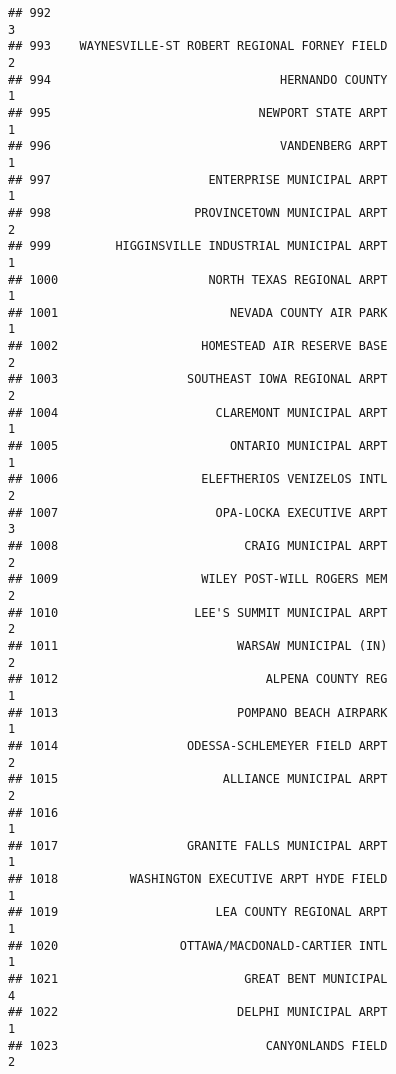 \documentclass[
]{article}
\begin{document}
\begin{verbatim}
## 992                                                                          3
## 993    WAYNESVILLE-ST ROBERT REGIONAL FORNEY FIELD                           2
## 994                                HERNANDO COUNTY                           1
## 995                             NEWPORT STATE ARPT                           1
## 996                                VANDENBERG ARPT                           1
## 997                      ENTERPRISE MUNICIPAL ARPT                           1
## 998                    PROVINCETOWN MUNICIPAL ARPT                           2
## 999         HIGGINSVILLE INDUSTRIAL MUNICIPAL ARPT                           1
## 1000                     NORTH TEXAS REGIONAL ARPT                           1
## 1001                        NEVADA COUNTY AIR PARK                           1
## 1002                    HOMESTEAD AIR RESERVE BASE                           2
## 1003                  SOUTHEAST IOWA REGIONAL ARPT                           2
## 1004                      CLAREMONT MUNICIPAL ARPT                           1
## 1005                        ONTARIO MUNICIPAL ARPT                           1
## 1006                    ELEFTHERIOS VENIZELOS INTL                           2
## 1007                      OPA-LOCKA EXECUTIVE ARPT                           3
## 1008                          CRAIG MUNICIPAL ARPT                           2
## 1009                    WILEY POST-WILL ROGERS MEM                           2
## 1010                   LEE'S SUMMIT MUNICIPAL ARPT                           2
## 1011                         WARSAW MUNICIPAL (IN)                           2
## 1012                             ALPENA COUNTY REG                           1
## 1013                         POMPANO BEACH AIRPARK                           1
## 1014                  ODESSA-SCHLEMEYER FIELD ARPT                           2
## 1015                       ALLIANCE MUNICIPAL ARPT                           2
## 1016                                                                         1
## 1017                  GRANITE FALLS MUNICIPAL ARPT                           1
## 1018          WASHINGTON EXECUTIVE ARPT HYDE FIELD                           1
## 1019                      LEA COUNTY REGIONAL ARPT                           1
## 1020                 OTTAWA/MACDONALD-CARTIER INTL                           1
## 1021                          GREAT BENT MUNICIPAL                           4
## 1022                         DELPHI MUNICIPAL ARPT                           1
## 1023                             CANYONLANDS FIELD                           2

\end{verbatim}
\end{document}
